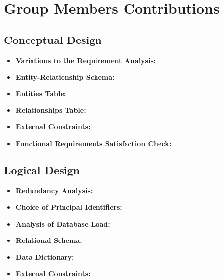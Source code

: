 \section{Group Members Contributions}


\subsection{Conceptual Design}
\begin{itemize}
	\item \textbf{Variations to the Requirement Analysis:}
	\item \textbf{Entity-Relationship Schema:} 
	\item \textbf{Entities Table:}
	\item \textbf{Relationships Table:}
	\item \textbf{External Constraints:}
	\item \textbf{Functional Requirements Satisfaction Check:}
\end{itemize}

\subsection{Logical Design}
\begin{itemize}
	\item \textbf{Redundancy Analysis:} 
	\item \textbf{Choice of Principal Identifiers:}
	\item \textbf{Analysis of Database Load:}
	\item \textbf{Relational Schema:}
	\item \textbf{Data Dictionary:}
	\item \textbf{External Constraints:}
\end{itemize}	